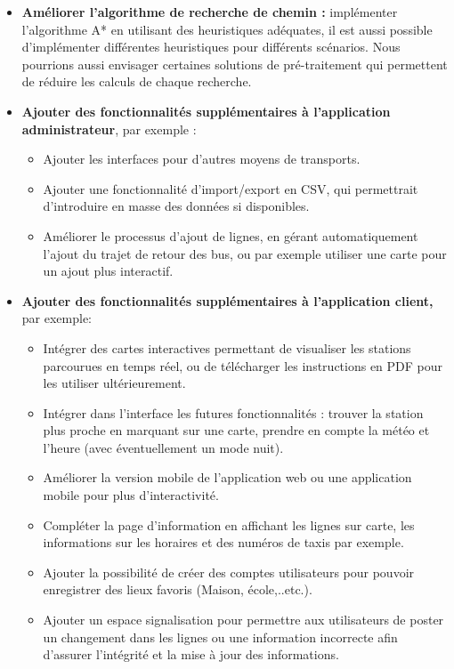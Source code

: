 \begin{itemize}
	\item \textbf{Améliorer l'algorithme de recherche de chemin :}  implémenter l'algorithme A* en utilisant des heuristiques adéquates, il est aussi possible d'implémenter différentes heuristiques pour différents scénarios.\newline
	Nous pourrions aussi envisager certaines solutions de pré-traitement qui permettent de réduire les calculs de chaque recherche.
	\item \textbf{Ajouter des fonctionnalités supplémentaires à l'application administrateur}, par exemple :
		\begin{itemize}
			\item Ajouter les interfaces pour d'autres moyens de transports.
			\item Ajouter une fonctionnalité d'import/export en CSV, qui permettrait d'introduire en masse des données si disponibles.
			\item Améliorer le processus d'ajout de lignes, en gérant automatiquement l'ajout du trajet de retour des bus, ou par exemple utiliser une carte pour un ajout plus interactif.
		\end{itemize}
	\item \textbf{Ajouter des fonctionnalités supplémentaires à l'application client,} par exemple:
		\begin{itemize}
			\item Intégrer des cartes interactives permettant de visualiser les stations parcourues en temps réel, ou de télécharger les instructions en PDF pour les utiliser ultérieurement.
			\item Intégrer dans l'interface les futures fonctionnalités : trouver la station plus proche en marquant sur une carte, prendre en compte la météo et l'heure (avec éventuellement un mode nuit).
			\item Améliorer la version mobile de l'application web ou une application mobile pour plus d'interactivité.
			\item Compléter la page d'information en affichant les lignes sur carte, les informations sur les horaires et des numéros de taxis par exemple.
			\item Ajouter la possibilité de créer des comptes utilisateurs pour pouvoir enregistrer des lieux favoris (Maison, école,..etc.).
			\item Ajouter un espace signalisation pour permettre aux utilisateurs de poster un changement dans les lignes ou une information incorrecte afin d'assurer l'intégrité et la mise à jour des informations.
		\end{itemize}
\end{itemize}